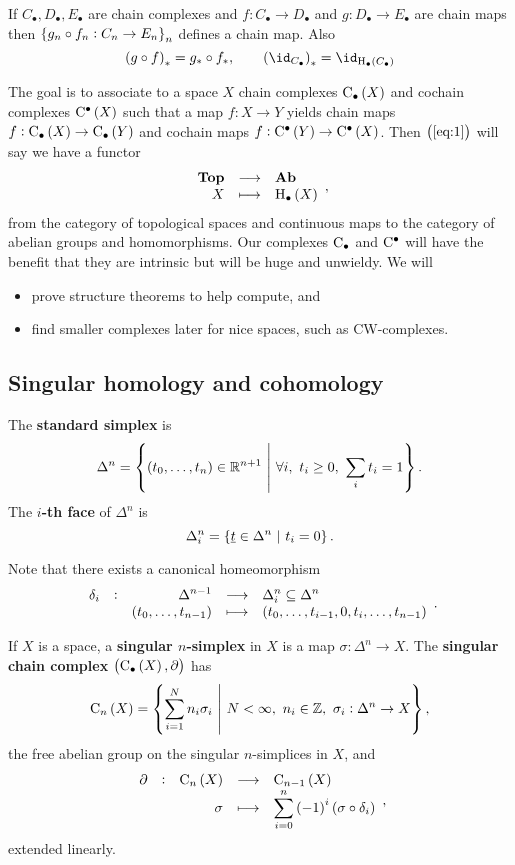 \begin{exercise*}
If $ C_\bullet, D_\bullet, E_\bullet $ are chain complexes and $ f : C_\bullet \to D_\bullet $ and $ g : D_\bullet \to E_\bullet $ are chain maps then $ \cbr{g_n \circ f_n : C_n \to E_n}_n $ defines a chain map. Also
\begin{equation}
\label{eq:1}
\br{g \circ f}_* = g_* \circ f_*, \qquad \br{\id_{C_\bullet}}_* = \id_{\H_\bullet\br{C_\bullet}}
\end{equation}
\end{exercise*}

\pagebreak

The goal is to associate to a space $ X $ chain complexes $ \C_\bullet\br{X} $ and cochain complexes $ \C^\bullet\br{X} $ such that a map $ f : X \to Y $ yields chain maps $ f : \C_\bullet\br{X} \to \C_\bullet\br{Y} $ and cochain maps $ f : \C^\bullet\br{Y} \to \C^\bullet\br{X} $. Then $ \br{\ref{eq:1}} $ will say we have a functor
$$ \function{\textbf{Top}}{\textbf{Ab}}{X}{\H_\bullet\br{X}}, $$
from the category of topological spaces and continuous maps to the category of abelian groups and homomorphisms. Our complexes $ \mathrm{C}_\bullet $ and $ \mathrm{C}^\bullet $ will have the benefit that they are intrinsic but will be huge and unwieldy. We will
\begin{itemize}
\item prove structure theorems to help compute, and
\item find smaller complexes later for nice spaces, such as CW-complexes.
\end{itemize}

\subsection{Singular homology and cohomology}

\begin{definition*}
The \textbf{standard simplex} is
$$ \Delta^n = \cbr{\br{t_0, \dots, t_n} \in \RR^{n + 1} \st \forall i, \ t_i \ge 0, \ \sum_i t_i = 1}. $$
The \textbf{$ i $-th face} of $ \Delta^n $ is
$$ \Delta_i^n = \cbr{\underline{t} \in \Delta^n \st t_i = 0}. $$
\end{definition*}

Note that there exists a canonical homeomorphism
$$ \function[\delta_i]{\Delta^{n - 1}}{\Delta_i^n \subseteq \Delta^n}{\br{t_0, \dots, t_{n - 1}}}{\br{t_0, \dots, t_{i - 1}, 0, t_i, \dots, t_{n - 1}}}. $$

\begin{definition*}
If $ X $ is a space, a \textbf{singular $ n $-simplex} in $ X $ is a map $ \sigma : \Delta^n \to X $. The \textbf{singular chain complex} $ \br{\C_\bullet\br{X}, \da} $ has
$$ \C_n\br{X} = \cbr{\sum_{i = 1}^N n_i\sigma_i \st N < \infty, \ n_i \in \ZZ, \ \sigma_i : \Delta^n \to X}, $$
the free abelian group on the singular $ n $-simplices in $ X $, and
$$ \function[\da]{\C_n\br{X}}{\C_{n - 1}\br{X}}{\sigma}{\sum_{i = 0}^n \br{-1}^i\br{\sigma \circ \delta_i}}, $$
extended linearly.
\end{definition*}

